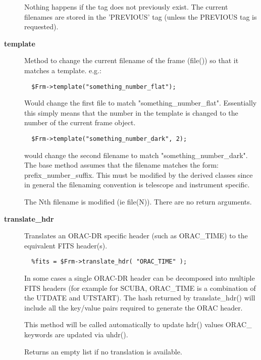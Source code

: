 \begin{description}
Nothing happens if the tag does not previously exist.
The current filenames are stored in the 'PREVIOUS' tag (unless the
PREVIOUS tag is requested).

\item[\textbf{template}] \mbox{}

Method to change the current filename of the frame (file())
so that it matches a template. e.g.:

\begin{verbatim}
  $Frm->template("something_number_flat");
\end{verbatim}


Would change the first file to match "something\_number\_flat".
Essentially this simply means that the number in the template
is changed to the number of the current frame object.

\begin{verbatim}
  $Frm->template("something_number_dark", 2);
\end{verbatim}


would change the second filename to match "something\_number\_dark".
The base method assumes that the filename matches the form:
prefix\_number\_suffix. This must be modified by the derived
classes since in general the filenaming convention is telescope
and instrument specific.



The Nth filename is modified (ie file(N)).
There are no return arguments.

\item[\textbf{translate\_hdr}] \mbox{}

Translates an ORAC-DR specific header (such as ORAC\_TIME)
to the equivalent FITS header(s).

\begin{verbatim}
  %fits = $Frm->translate_hdr( "ORAC_TIME" );
\end{verbatim}


In some cases a single ORAC-DR header can be decomposed into 
multiple FITS headers (for example for SCUBA, ORAC\_TIME is
a combination of the UTDATE and UTSTART). The hash returned
by translate\_hdr() will include all the key/value pairs required
to generate the ORAC header.



This method will be called automatically to update hdr() values
ORAC\_ keywords are updated via uhdr().



Returns an empty list if no translation is available.

\end{description}
